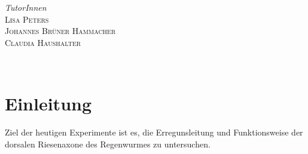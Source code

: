 \documentclass[11pt]{article}
\begin{document}
\begin{titlepage}
\begin{minipage}{0.45\textwidth}
\begin{flushright}
		\end{flushright}
	\end{minipage}
\vfill
	\begin{minipage}{0.7\textwidth}
		\begin{flushleft}
			\large
			\textit{TutorInnen}\\
			\textsc{Lisa Peters}\\
			\textsc{Johannes Brüner Hammacher}\\
			\textsc{Claudia Haushalter}
		\end{flushleft}
	\end{minipage}
	~
		\begin{minipage}{0.2\textwidth}
		\begin{flushright}
			
		\end{flushright}
	\end{minipage}

	\vfill\vfill\vfill %

	
	\vfill %
	
\end{titlepage}

\section{Einleitung}
Ziel der heutigen Experimente ist es, die Erregunsleitung und Funktionsweise der dorsalen Riesenaxone des Regenwurmes zu untersuchen. 
\end{document}
